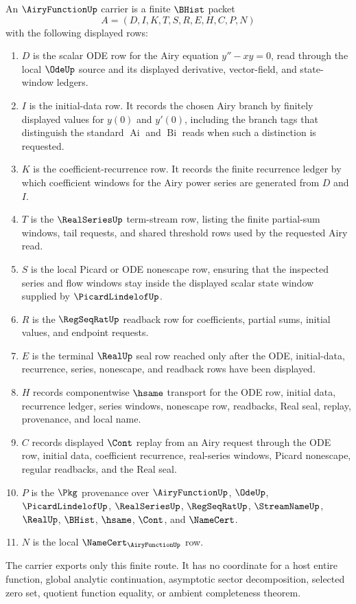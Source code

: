 \begin{definition}
\label{def:airy-function-carrier}
An $\AiryFunctionUp$ carrier is a finite $\BHist$ packet
$$
A=(D,I,K,T,S,R,E,H,C,P,N)
$$
with the following displayed rows:
\begin{enumerate}
\item $D$ is the scalar ODE row for the Airy equation $y''-xy=0$, read through the local $\OdeUp$ source and its displayed derivative, vector-field, and state-window ledgers.
\item $I$ is the initial-data row. It records the chosen Airy branch by finitely displayed values for $y(0)$ and $y'(0)$, including the branch tags that distinguish the standard $\operatorname{Ai}$ and $\operatorname{Bi}$ reads when such a distinction is requested.
\item $K$ is the coefficient-recurrence row. It records the finite recurrence ledger by which coefficient windows for the Airy power series are generated from $D$ and $I$.
\item $T$ is the $\RealSeriesUp$ term-stream row, listing the finite partial-sum windows, tail requests, and shared threshold rows used by the requested Airy read.
\item $S$ is the local Picard or ODE nonescape row, ensuring that the inspected series and flow windows stay inside the displayed scalar state window supplied by $\PicardLindelofUp$.
\item $R$ is the $\RegSeqRatUp$ readback row for coefficients, partial sums, initial values, and endpoint requests.
\item $E$ is the terminal $\RealUp$ seal row reached only after the ODE, initial-data, recurrence, series, nonescape, and readback rows have been displayed.
\item $H$ records componentwise $\hsame$ transport for the ODE row, initial data, recurrence ledger, series windows, nonescape row, readbacks, Real seal, replay, provenance, and local name.
\item $C$ records displayed $\Cont$ replay from an Airy request through the ODE row, initial data, coefficient recurrence, real-series windows, Picard nonescape, regular readbacks, and the Real seal.
\item $P$ is the $\Pkg$ provenance over $\AiryFunctionUp$, $\OdeUp$, $\PicardLindelofUp$, $\RealSeriesUp$, $\RegSeqRatUp$, $\StreamNameUp$, $\RealUp$, $\BHist$, $\hsame$, $\Cont$, and $\NameCert$.
\item $N$ is the local $\NameCert_{\AiryFunctionUp}$ row.
\end{enumerate}
The carrier exports only this finite route. It has no coordinate for a host entire function, global analytic continuation, asymptotic sector decomposition, selected zero set, quotient function equality, or ambient completeness theorem.
\end{definition}

